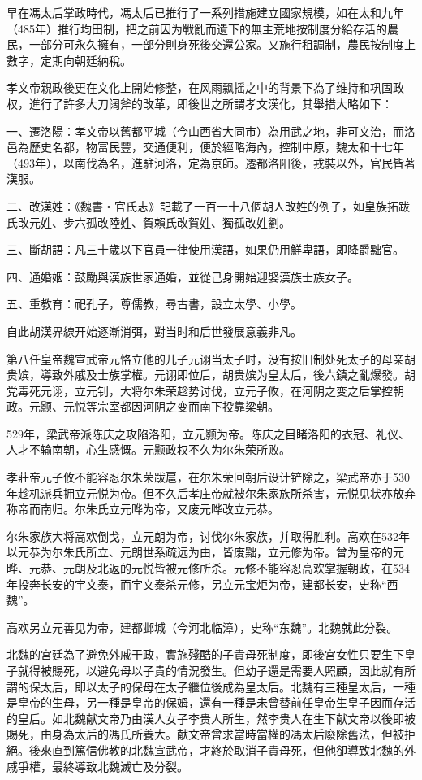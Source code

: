 早在馮太后掌政時代，馮太后已推行了一系列措施建立國家規模，如在太和九年（485年）推行均田制，把之前因为戰亂而遺下的無主荒地按制度分給存活的農民，一部分可永久擁有，一部分則身死後交還公家。又施行租調制，農民按制度上數字，定期向朝廷納稅。

孝文帝親政後更在文化上開始修整，在风雨飘摇之中的背景下為了维持和巩固政权，進行了許多大刀阔斧的改革，即後世之所謂孝文漢化，其舉措大略如下：

一、遷洛陽：孝文帝以舊都平城（今山西省大同市）為用武之地，非可文治，而洛邑為歷史名都，物富民豐，交通便利，便於經略海內，控制中原，魏太和十七年（493年），以南伐為名，進駐河洛，定為京師。遷都洛阳後，戎裝以外，官民皆著漢服。

二、改漢姓：《魏書‧官氏志》記載了一百一十八個胡人改姓的例子，如皇族拓跋氏改元姓、步六孤改陸姓、賀賴氏改賀姓、獨孤改姓劉。

三、斷胡語：凡三十歲以下官員一律使用漢語，如果仍用鮮卑語，即降爵黜官。

四、通婚姻：鼓勵與漢族世家通婚，並從己身開始迎娶漢族士族女子。

五、重教育：祀孔子，尊儒教，尋古書，設立太學、小學。

自此胡漢界線开始逐漸消弭，對当时和后世發展意義非凡。

第八任皇帝魏宣武帝元恪立他的儿子元诩当太子时，没有按旧制处死太子的母亲胡贵嫔，導致外戚及士族掌權。元诩即位后，胡贵嫔为皇太后，後六鎮之亂爆發。胡党毒死元诩，立元钊，大将尔朱荣趁势讨伐，立元子攸，在河阴之变之后掌控朝政。元颢、元悦等宗室都因河阴之变而南下投靠梁朝。

529年，梁武帝派陈庆之攻陷洛阳，立元颢为帝。陈庆之目睹洛阳的衣冠、礼仪、人才不输南朝，心生感慨。元颢政权不久为尔朱荣所败。

孝莊帝元子攸不能容忍尔朱荣跋扈，在尔朱荣回朝后设计铲除之，梁武帝亦于530年趁机派兵拥立元悦为帝。但不久后孝庄帝就被尔朱家族所杀害，元悦见状亦放弃称帝而南归。尔朱氏立元晔为帝，又废元晔改立元恭。

尔朱家族大将高欢倒戈，立元朗为帝，讨伐尔朱家族，并取得胜利。高欢在532年以元恭为尔朱氏所立、元朗世系疏远为由，皆废黜，立元修为帝。曾为皇帝的元晔、元恭、元朗及北返的元悦皆被元修所杀。元修不能容忍高欢掌握朝政，在534年投奔长安的宇文泰，而宇文泰杀元修，另立元宝炬为帝，建都长安，史称“西魏”。

高欢另立元善见为帝，建都邺城（今河北临漳），史称“东魏”。北魏就此分裂。

北魏的宮廷為了避免外戚干政，實施殘酷的子貴母死制度，即後宮女性只要生下皇子就得被賜死，以避免母以子貴的情況發生。但幼子還是需要人照顧，因此就有所謂的保太后，即以太子的保母在太子繼位後成為皇太后。北魏有三種皇太后，一種是皇帝的生母，另一種是皇帝的保姆，還有一種是未曾替前任皇帝生皇子因而存活的皇后。如北魏献文帝乃由漢人女子李贵人所生，然李贵人在生下献文帝以後即被賜死，由身為太后的馮氏所養大。献文帝曾求當時當權的馮太后廢除舊法，但被拒絕。後來直到篤信佛教的北魏宣武帝，才終於取消子貴母死，但他卻導致北魏的外戚爭權，最終導致北魏滅亡及分裂。

